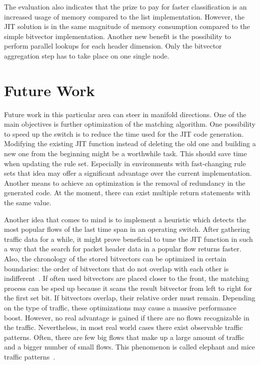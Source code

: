\documentclass[a4paper,
		12pt,
		parskip=full,
		titlepage
		]{scrartcl}
\begin{document}
The evaluation also indicates that the prize to pay for faster classification 
is an increased usage of memory compared to the list implementation.
However, the JIT solution is in the same magnitude of memory consumption 
compared to the simple bitvector implementation. 
Another new benefit is the possibility to perform parallel lookups for each header dimension.
Only the bitvector aggregation step has to take place on one single node.

\section{Future Work}
Future work in this particular area can steer in manifold directions.
One of the main objectives is further optimization of the matching algorithm.
One possibility to speed up the switch is to reduce the time used for the JIT code generation.
Modifying the existing JIT function instead of deleting the old one and building 
a new one from the beginning might be a worthwhile task.
This should save time when updating the rule set.
Especially in environments with fast-changing rule sets that idea may offer 
a significant advantage over the current implementation.
Another means to achieve an optimization is the removal of redundancy in the generated code.
At the moment, there can exist multiple return statements with the same value.

Another idea that comes to mind is to implement a heuristic which detects 
the most popular flows of the last time span in an operating switch.
After gathering traffic data for a while, it might prove beneficial to tune 
the JIT function in such a way that the search for packet header data in a popular flow returns faster.
Also, the chronology of the stored bitvectors can be optimized in certain boundaries:
the order of bitvectors that do not overlap with each other is indifferent~\cite{abv}.
If often used bitvectors are placed closer to the front, the matching process 
can be sped up because it scans the result bitvector from left to right for the first set bit.
If bitvectors overlap, their relative order must remain.
Depending on the type of traffic, these optimizations may cause a massive performance boost.
However, no real advantage is gained if there are no flows recognizable in the traffic.
Nevertheless, in most real world cases there exist observable traffic patterns.
Often, there are few big flows that make up a large amount of traffic and a bigger number of
small flows.
This phenomenon is called elephant and mice traffic patterns~\cite{elephantmice}.
\end{document}
